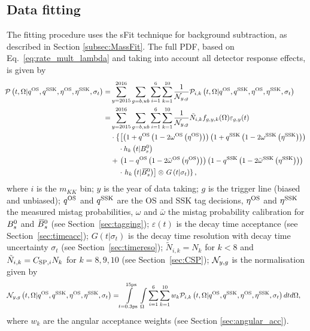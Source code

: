 \subsection{Data fitting}
The fitting procedure uses the sFit technique for background subtraction, as described in Section \ref{subsec:MassFit}.
The full PDF, based on Eq.~\eqref{eq:rate_mult_lambda} and taking into account all detector response effects, is given by
\small{
\begin{align}
 \!\!{\cal P}\left( t,\Omega| q^{\rm OS},  q^{\rm SSK}, \eta^{\rm OS}, \eta^{\rm SSK}, \sigma_{t} \right) = & 
 \sum_{y=2015}^{2016}\sum_{g=b,ub}\sum_{i=1}^{6}\sum_{k=1}^{10}\frac{1}{{\cal N}_{y,g}}{\cal P}_{i,k}\left( t,\Omega| q^{\rm OS},  q^{\rm SSK}, \eta^{\rm OS}, \eta^{\rm SSK}, \sigma_{t} \right) \nonumber \\
 = & \sum_{y=2015}^{2016}\sum_{g=b,ub}\sum_{i=1}^{6}\sum_{k=1}^{10} \frac{1}{{\cal N}_{y,g}}\tilde{N}_{i,k} f_{g,y,k}(\Omega)\varepsilon_{g,y}(t) \nonumber \\
 & \cdot \left\{\left[\left( 1+q^{\rm OS}\left(1-2\omega^{\rm OS}\left(\eta^{\rm OS}\right)\right)\right)
 \left(1+q^{\rm SSK}\left(1-2\omega^{\rm SSK}\left(\eta^{\rm SSK}\right)\right)\right)\right . \right .\nonumber \\
 & \;\;\;\;\cdot h_k\left(t | B^0_s\right) \nonumber \\
 & +       \left .    \left(1-q^{\rm OS}\left(1-2\bar{\omega}^{\rm OS}\left(\eta^{\rm OS}\right)\right)\right)
\left(1-q^{\rm SSK}\left(1-2\bar{\omega}^{\rm SSK}\left(\eta^{\rm SSK}\right)\right)\right) \right.\nonumber \\
  & \;\;\;\;\cdot \left. h_k\left(t | \kern 0.18em\overline{\kern -0.18em B}{}^0_s\right) \right] \otimes \left. G\left(t | \sigma_{t}\right) \right\},
 \label{eq:fullpdf}
 \end{align}}
where $i$ is the $m_{KK}$ bin; $y$ is the year of data taking; $g$ is the trigger line (biased and unbiased); $q^{\rm OS}$ and $q^{\rm SSK}$ are the OS and SSK tag decisions, $\eta^{\rm OS}$ and $\eta^{\rm SSK}$ the measured mistag probabilities, $\omega$ and $\bar{\omega}$ the mistag probability calibration for
$B^0_s$ and $\kern 0.18em\overline{\kern -0.18em B}{}^0_s$ (see Section~\ref{sec:tagging}); $\varepsilon(t)$ is the decay time acceptance (see Section~\ref{sec:timeacc}); $G\left(t | \sigma_{t}\right)$ is the decay time resolution with
decay time uncertainty $\sigma_{t}$ (see Section~\ref{sec:timereso}); $\tilde{N}_{i,k} = N_{k}$ for $k<8$ and $\tilde{N}_{i,k} = C_{{\rm SP},i}N_{k}$ for $k=8,9,10$ (see Section~\ref{sec:CSP}); 
${\cal N}_{y,g}$ is the normalisation given by
\begin{align}
 {\cal N}_{y,g}\left( t,\Omega| q^{\rm OS},  q^{\rm SSK}, \eta^{\rm OS}, \eta^{\rm SSK}, \sigma_{t} \right) = & 
 \int\displaylimits_{t=0.3\text{ps}}^{15\text{ps}}\int\displaylimits_{\Omega} \sum_{i=1}^{6} \sum_{k=1}^{10}w_{k} {\cal P}_{i,k}
 \left( t,\Omega| q^{\rm OS},  q^{\rm SSK}, \eta^{\rm OS}, \eta^{\rm SSK}, \sigma_{t} \right) dt d\Omega,
\end{align}
where $w_{k}$ are the angular acceptance weights (see Section \ref{sec:angular_acc}).

